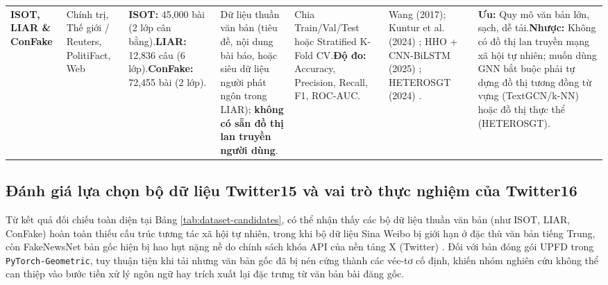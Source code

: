 \documentclass[11pt,a4paper]{extreport}
\begin{document}
\begin{landscape}
\begin{longtable}{@{}p{2.8cm}p{2.2cm}p{2.8cm}p{3.8cm}p{3.2cm}p{3.6cm}p{4.2cm}@{}}
\textbf{ISOT, LIAR \& ConFake} \cite{noauthor_fake_2023, noauthor_comparative_2024, noauthor_hybrid_2025} & Chính trị, Thế giới / Reuters, PolitiFact, Web & \textbf{ISOT:} 45,000 bài (2 lớp cân bằng).\newline \textbf{LIAR:} 12,836 câu (6 lớp).\newline \textbf{ConFake:} 72,455 bài (2 lớp). & Dữ liệu thuần văn bản (tiêu đề, nội dung bài báo, hoặc siêu dữ liệu người phát ngôn trong LIAR); \textbf{không có sẵn đồ thị lan truyền người dùng}. & Chia Train/Val/Test hoặc Stratified K-Fold CV.\newline \textbf{Độ đo:} Accuracy, Precision, Recall, F1, ROC-AUC. & Wang (2017); Kuntur et al. (2024) \cite{noauthor_comparative_2024}; HHO + CNN-BiLSTM (2025) \cite{noauthor_hybrid_2025}; HETEROSGT (2024) \cite{noauthor_heterogeneous_2024}. & \textbf{Ưu:} Quy mô văn bản lớn, sạch, dễ tải.\newline \textbf{Nhược:} Không có đồ thị lan truyền mạng xã hội tự nhiên; muốn dùng GNN bắt buộc phải tự dựng đồ thị tương đồng từ vựng (TextGCN/k-NN) hoặc đồ thị thực thể (HETEROSGT). \\ 

\end{longtable}
\setlength{\tabcolsep}{6pt}
\end{landscape}

\subsection{Đánh giá lựa chọn bộ dữ liệu Twitter15 và vai trò thực nghiệm của Twitter16}
Từ kết quả đối chiếu toàn diện tại Bảng \ref{tab:dataset-candidates}, có thể nhận thấy các bộ dữ liệu thuần văn bản (như ISOT, LIAR, ConFake) hoàn toàn thiếu cấu trúc tương tác xã hội tự nhiên, trong khi bộ dữ liệu Sina Weibo bị giới hạn ở đặc thù văn bản tiếng Trung, còn FakeNewsNet bản gốc hiện bị hao hụt nặng nề do chính sách khóa API của nền tảng X (Twitter) \cite{noauthor_exploiting_2024}. Đối với bản đóng gói UPFD trong \texttt{PyTorch-Geometric}, tuy thuận tiện khi tải nhưng văn bản gốc đã bị nén cứng thành các véc-tơ cố định, khiến nhóm nghiên cứu không thể can thiệp vào bước tiền xử lý ngôn ngữ hay trích xuất lại đặc trưng từ văn bản bài đăng gốc.
\end{document}

